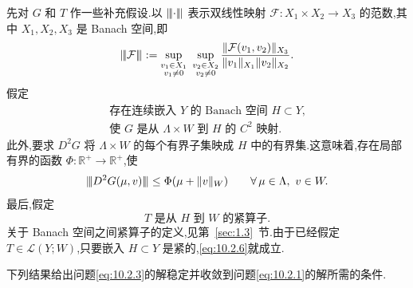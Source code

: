 先对 \(G\) 和 \(T\) 作一些补充假设.以 \(\lVert\!\lvert \cdot\rvert\!\rVert\) 表示双线性映射 \(\mathcal F\colon X_1\times X_2\to X_3\) 的范数,其中 \(X_1,X_2,X_3\) 是 Banach 空间,即
\[
  \tnorm{\mathcal F}:=
   \sup_{\substack{v_1\in X_1\\v_1\ne0}}\ 
   \sup_{\substack{v_2\in X_2\\v_2\ne0}}
   \frac{\|\mathcal F(v_1,v_2)\|_{X_3}}{\|v_1\|_{X_1}\|v_2\|_{X_2}}.
\]
假定
\begin{equation}\label{eq:10.2.4}
  \begin{gathered}
    \text{存在连续嵌入 \(Y\) 的 Banach 空间 \(H\subset Y\),}\\
    \text{使 \(G\) 是从 \(\Lambda\times W\) 到 \(H\) 的 \(C^2\) 映射.}
  \end{gathered}
\end{equation}
此外,要求 \(D^2G\) 将 \(\Lambda\times W\) 的每个有界子集映成 \(H\) 中的有界集.这意味着,存在局部有界的函数 \(\Phi\colon\mathbb R^+\to\mathbb R^+\),使
\begin{equation}\label{eq:10.2.5}
  \tnorm{D^2G(\mu,v)}\le\Phi(\mu+\|v\|_W)\qquad\forall\,\mu\in\Lambda,\ v\in W.
\end{equation}
最后,假定
\begin{equation}\label{eq:10.2.6}
  T\text{ 是从 \(H\) 到 \(W\) 的紧算子.}
\end{equation}
关于 Banach 空间之间紧算子的定义,见第~\ref{sec:1.3}~节.由于已经假定 \(T\in\mathcal L(Y;W)\),只要嵌入 \(H\subset Y\) 是紧的,\eqref{eq:10.2.6}就成立.

下列结果给出问题\eqref{eq:10.2.3}的解稳定并收敛到问题\eqref{eq:10.2.1}的解所需的条件.

